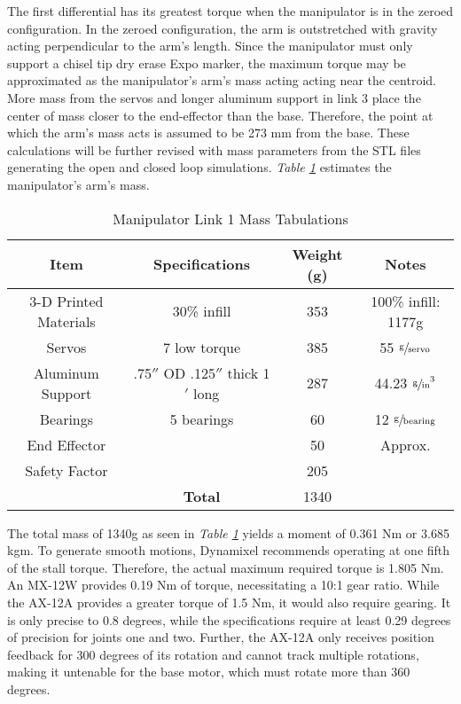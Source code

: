 The first differential has its greatest torque when the manipulator is in the zeroed configuration. In the zeroed configuration, the arm is outstretched with gravity acting perpendicular to the arm’s length. Since the manipulator must only support a chisel tip dry erase Expo marker, the maximum torque may be approximated as the manipulator’s arm’s mass acting acting near the centroid. More mass from the servos and longer aluminum support in link 3 place the center of mass closer to the end-effector than the base. Therefore, the point at which the arm’s mass acts is assumed to be 273 mm from the base. These calculations will be further revised with mass parameters from the STL files generating the open and closed loop simulations. \emph{Table \ref{tab:arm1}} estimates the manipulator’s arm’s mass.
\begin{table}[htp]
  \center
  \caption{Manipulator Link 1 Mass Tabulations}
  \label{tab:arm1}
\begin{tabular}{cc|cc}
  \textbf{Item} & \textbf{Specifications} & \textbf{Weight (g)} & \textbf{Notes} \\\hline
  3-D Printed Materials & 30\% infill & 353 & 100\% infill: 1177g \\
  Servos & 7 low torque & 385 & 55 $\sfrac{\text{g}}{\text{servo}}$ \\
  Aluminum Support & .75$''$  OD .125$''$  thick 1$'$ long & 287 & 44.23 $\sfrac{\text{g}}{\text{in}}^3$ \\
  Bearings & 5 bearings & 60 & 12 $\sfrac{\text{g}}{\text{bearing}}$ \\
  End Effector & & 50 & Approx. \\
  Safety Factor & & 205 & \\
  & \textbf{Total} & 1340 & \\
\end{tabular}
\end{table}

The total mass of 1340g as seen in \emph{Table \ref{tab:arm1}} yields a moment of 0.361 Nm or 3.685 kgm. To generate smooth motions, Dynamixel recommends operating at one fifth of the stall torque. Therefore, the actual maximum required torque is 1.805 Nm. An MX-12W provides 0.19 Nm of torque, necessitating a 10:1 gear ratio. While the AX-12A provides a greater torque of 1.5 Nm, it would also require gearing. It is only precise to 0.8 degrees, while the specifications require at least 0.29 degrees of precision for joints one and two. Further, the AX-12A only receives position feedback for 300 degrees of its rotation and cannot track multiple rotations, making it untenable for the base motor, which must rotate more than 360 degrees.

